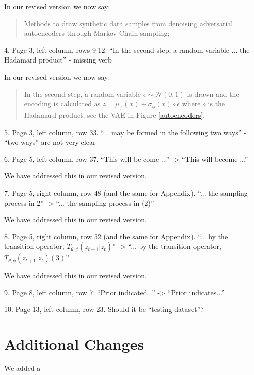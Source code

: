 \documentclass{article}
\begin{document}
In our revised version we now say:
\begin{quote}
Methods to draw synthetic data samples from denoising adversarial autoencoders through Markov-Chain sampling;
\end{quote}

{\color{blue}
4. Page 3, left column, rows 9-12. ``In the second step, a random variable ... the Hadamard product'' - missing verb
}

In our revised version we now say:
\begin{quote}
In the second step, a random variable $\epsilon \sim \mathcal{N}(0,1)$ is drawn and the encoding is calculated as $z = \mu_\phi(x) + \sigma_\phi(x) \circ \epsilon$ where $\circ$ is the Hadamard product, see the VAE in Figure \ref{autoencoders}.
\end{quote}

{\color{blue}
5. Page 3, left column, row 33. ``... may be formed in the following two ways'' - ``two ways'' are not very clear
}

{\color{blue}
6. Page 5, left column, row 37. ``This will be come ...'' -> ``This will become ...''
}

We have addressed this in our revised version.

{\color{blue}
7. Page 5, right column, row 48 (and the same for Appendix). ``... the sampling process in 2'' -> ``... the sampling process in (2)''
}

We have addressed this in our revised version.

8. Page 5, right column, row 52 (and the same for Appendix). ``... by the transition operator, $T_{\theta, \phi}(z_{t+1}|z_t)$'' -> ``... by the transition operator, $T_{\theta, \phi}(z_{t+1}|z_t) (3)$''

We have addressed this in our revised version.

9. Page 8, left column, row 7. ``Prior indicated...'' -> ``Prior indicates...''


10. Page 13, left column, row 23. Should it be ``testing dataset''?


\section{Additional Changes}

We added a 
\end{document}
